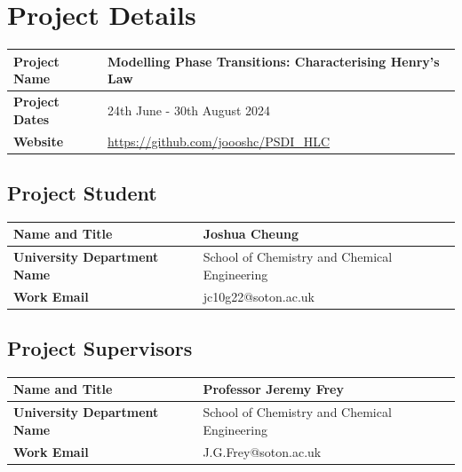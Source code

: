 \documentclass[11pt, titlepage]{article}
\newcommand{\projectname}{Modelling Phase Transitions: Characterising Henry's Law\xspace} %
\newcommand{\projectdates}{24th June - 30th August 2024\xspace} %
\begin{document}
\renewcommand{\arraystretch}{1.5}

\PSDITitlePage{}
\publishinginfo{}
\PSDIContents{}

\setcounter{page}{1}
\section{Project Details}

\begin{table}[H]
\centering
\begin{tabular}{|p{1.5in}|p{4.5in}|}
\hline %
\textbf{Project Name} & {\projectname} \\ %
\hline %
\textbf{Project Dates} & {\projectdates} \\ %
\hline %
\textbf{Website} & 
\href{xxx}{\url{https://github.com/joooshc/PSDI_HLC}} \\ %
\hline
\end{tabular}
 \end{table}

\subsection{Project Student}
\begin{table}[H]
	\centering
	\begin{tabular}{|p{2in}|p{4in}|}
		\hline
		\textbf{Name and Title} & Joshua Cheung \\ %
		\hline
		\textbf{University Department Name} & 
		School of Chemistry and Chemical Engineering \\ %
		\hline
		\textbf{Work Email} & 
		jc10g22@soton.ac.uk \\ %
		\hline	
	\end{tabular}
\end{table}

\subsection{Project Supervisors}
\begin{table}[H]
	\centering
	\begin{tabular}{|p{2in}|p{4in}|}
		\hline
		\textbf{Name and Title} & Professor Jeremy Frey \\ %
		\hline
		\textbf{University Department Name} & 
		School of Chemistry and Chemical Engineering \\ %
		\hline
		\textbf{Work Email} & J.G.Frey@soton.ac.uk \\ %
		\hline
	\end{tabular}
\end{table}
\end{document}
